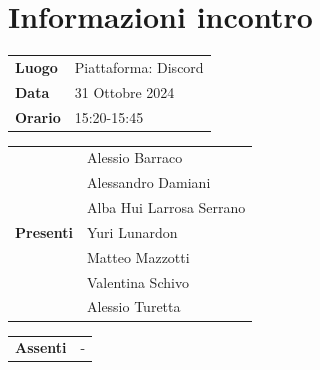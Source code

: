 \section{Informazioni incontro}
\vspace{0.25cm}
\begin{tabular}{p{1.75cm} | l}
    \textbf{Luogo} & Piattaforma: Discord\\
    \textbf{Data} & 31 Ottobre 2024\\
    \textbf{Orario} & 15:20-15:45\\
\end{tabular}

\vspace{0.5cm}
\noindent
\begin{tabular}{p{1.75cm} | l}
    \multirow{7}{*}{\textbf{Presenti}}
        & Alessio Barraco\\
        & Alessandro Damiani\\ %
        & Alba Hui Larrosa Serrano\\
        & Yuri Lunardon\\
        & Matteo Mazzotti\\
        & Valentina Schivo\\
        & Alessio Turetta
\end{tabular}

\vspace{0.5cm}
\noindent
\begin{tabular}{p{1.75cm} | l}
    \multirow{1}{*}{\textbf{Assenti}}
        & -\\
\end{tabular}

\vspace{0.5cm}
\noindent
\begin{tabular}{p{1.75cm} | l}
\end{tabular}